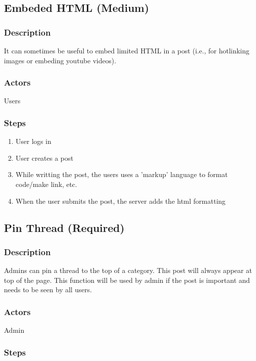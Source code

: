\documentclass[12pt]{scrartcl}
\begin{document}
\subsection{Embeded HTML (Medium)}
\subsubsection{Description}

It can sometimes be useful to embed limited HTML in a post (i.e., for hotlinking images or embeding youtube videos).

\subsubsection{Actors}

Users

\subsubsection{Steps}
\begin{enumerate}
\item User logs in
\item User creates a post
\item While writting the post, the users uses a 'markup' language to format code/make link, etc.
\item When the user submits the post, the server adds the html formatting
\end{enumerate}

\subsection{Pin Thread (Required)}
\subsubsection{Description}
Admins can pin a thread to the top of a category. This post will always appear at top of the page.
This function will be used by admin if the post is important and needs to be seen by all users.

\subsubsection{Actors}

Admin

\subsubsection{Steps}
\end{document}
